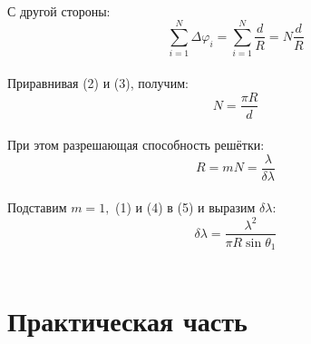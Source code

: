 \documentclass[a4paper]{article}
\begin{document}
\\
С другой стороны:
\begin{equation}\label{eq3}
\sum\limits_{i=1}^{N}\Delta\varphi_i=\sum\limits_{i=1}^{N}\displaystyle\frac{d}{R} = N \displaystyle \frac {d}{R}
\end{equation}
\\
Приравнивая (2) и (3), получим:
\begin{equation}\label{eq4}
N=\displaystyle\frac{\pi R}{d}
\end{equation}
\\
При этом разрешающая способность решётки:
\begin{equation}\label{eq5}
R=mN=\displaystyle\frac{\lambda}{\delta\lambda}
\end{equation}
\\
Подставим $m=1,$ (1) и (4) в (5) и выразим $\delta\lambda$:
\begin{equation}\label{eq6}
\delta\lambda=\displaystyle\frac{\lambda^2}{\pi R\sin\theta_1}
\end{equation}
\\
\section{Практическая часть}
\end{document}
